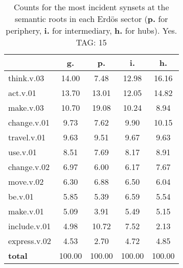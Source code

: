 \begin{table}[h!]
\begin{center}
\begin{tabular}{| l | c | c | c | c |}\hline
 & g. & p. & i. & h. \\\hline
think.v.03 & 14.00  & 7.48  & 12.98  & 16.16 \\\hline
act.v.01 & 13.70  & 13.01  & 12.05  & 14.82 \\\hline
make.v.03 & 10.70  & 19.08  & 10.24  & 8.94 \\\hline
change.v.01 & 9.73  & 7.62  & 9.90  & 10.15 \\\hline
travel.v.01 & 9.63  & 9.51  & 9.67  & 9.63 \\\hline
use.v.01 & 8.51  & 7.69  & 8.17  & 8.91 \\\hline
change.v.02 & 6.97  & 6.00  & 6.17  & 7.67 \\\hline
move.v.02 & 6.30  & 6.88  & 6.50  & 6.04 \\\hline
be.v.01 & 5.85  & 5.39  & 6.59  & 5.54 \\\hline
make.v.01 & 5.09  & 3.91  & 5.49  & 5.15 \\\hline
include.v.01 & 4.98  & 10.72  & 7.52  & 2.13 \\\hline
express.v.02 & 4.53  & 2.70  & 4.72  & 4.85 \\\hline
{{\bf total}} & 100.00  & 100.00  & 100.00  & 100.00 \\\hline
\end{tabular}
\caption{Counts for the most incident synsets at the semantic roots in each Erd\"os sector ({\bf p.} for periphery, {\bf i.} for intermediary, {\bf h.} for hubs). Yes. TAG: 15}
\end{center}
\end{table}